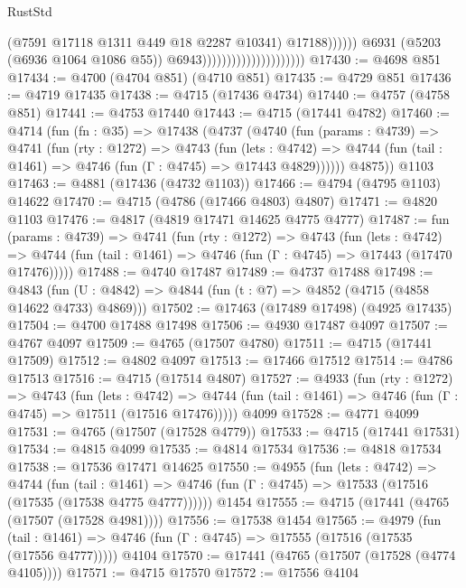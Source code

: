 \begin{lexlean}{RustStd}
\begin{coremodule}
                                                          (@7591 @17118 @1311 @449 @18 @2287 @10341)
                                                          @17188))))))
                                              @6931
                                              (@5203 (@6936 @1064 @1086 @55))
                                              @6943)))))))))))))))))))))
@17430 := @4698 @851
@17434 := @4700 (@4704 @851) (@4710 @851)
@17435 := @4729 @851
@17436 := @4719 @17435
@17438 := @4715 (@17436 @4734)
@17440 := @4757 (@4758 @851)
@17441 := @4753 @17440
@17443 := @4715 (@17441 @4782)
@17460 := @4714
    (fun (fn : @35) =>
    @17438
      (@4737
        (@4740
          (fun (params : @4739) =>
          @4741
            (fun (rty : @1272) =>
            @4743
              (fun (lets : @4742) =>
              @4744 (fun (tail : @1461) => @4746 (fun (Γ : @4745) => @17443 @4829))))))
        @4875))
    @1103
@17463 := @4881 (@17436 (@4732 @1103))
@17466 := @4794 (@4795 @1103) @14622
@17470 := @4715 (@4786 (@17466 @4803) @4807)
@17471 := @4820 @1103
@17476 := @4817 (@4819 @17471 @14625 @4775 @4777)
@17487 := fun (params : @4739) =>
  @4741
    (fun (rty : @1272) =>
    @4743
      (fun (lets : @4742) =>
      @4744 (fun (tail : @1461) => @4746 (fun (Γ : @4745) => @17443 (@17470 @17476)))))
@17488 := @4740 @17487
@17489 := @4737 @17488
@17498 := @4843
    (fun (U : @4842) => @4844 (fun (t : @7) => @4852 (@4715 (@4858 @14622 @4733) @4869)))
@17502 := @17463 (@17489 @17498) (@4925 @17435)
@17504 := @4700 @17488 @17498
@17506 := @4930 @17487 @4097
@17507 := @4767 @4097
@17509 := @4765 (@17507 @4780)
@17511 := @4715 (@17441 @17509)
@17512 := @4802 @4097
@17513 := @17466 @17512
@17514 := @4786 @17513
@17516 := @4715 (@17514 @4807)
@17527 := @4933
    (fun (rty : @1272) =>
    @4743
      (fun (lets : @4742) =>
      @4744 (fun (tail : @1461) => @4746 (fun (Γ : @4745) => @17511 (@17516 @17476)))))
    @4099
@17528 := @4771 @4099
@17531 := @4765 (@17507 (@17528 @4779))
@17533 := @4715 (@17441 @17531)
@17534 := @4815 @4099
@17535 := @4814 @17534
@17536 := @4818 @17534
@17538 := @17536 @17471 @14625
@17550 := @4955
    (fun (lets : @4742) =>
    @4744
      (fun (tail : @1461) =>
      @4746 (fun (Γ : @4745) => @17533 (@17516 (@17535 (@17538 @4775 @4777))))))
    @1454
@17555 := @4715 (@17441 (@4765 (@17507 (@17528 @4981))))
@17556 := @17538 @1454
@17565 := @4979
    (fun (tail : @1461) => @4746 (fun (Γ : @4745) => @17555 (@17516 (@17535 (@17556 @4777)))))
    @4104
@17570 := @17441 (@4765 (@17507 (@17528 (@4774 @4105))))
@17571 := @4715 @17570
@17572 := @17556 @4104

\end{coremodule}
\end{lexlean}
